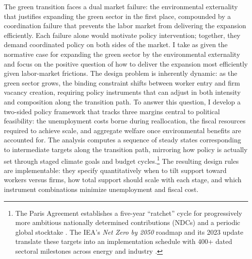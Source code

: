 \documentclass[preprint,12pt]{elsarticle}
\begin{document}
The green transition faces a dual market failure: the environmental externality that justifies expanding the green sector in the first place, compounded by a coordination failure that prevents the labor market from delivering the expansion efficiently. Each failure alone would motivate policy intervention; together, they demand coordinated policy on both sides of the market. I take as given the normative case for expanding the green sector by the environmental externality and focus on the positive question of how to deliver the expansion most efficiently given labor-market frictions. The design problem is inherently dynamic: as the green sector grows, the binding constraint shifts between worker entry and firm vacancy creation, requiring policy instruments that can adjust in both intensity and composition along the transition path. To answer this question, I develop a two-sided policy framework that tracks three margins central to political feasibility: the unemployment costs borne during reallocation, the fiscal resources required to achieve scale, and aggregate welfare once environmental benefits are accounted for. The analysis computes a sequence of steady states corresponding to intermediate targets along the transition path, mirroring how policy is actually set through staged climate goals and budget cycles.\footnote{The Paris Agreement establishes a five-year “ratchet” cycle for progressively more ambitious nationally determined contributions (NDCs) and a periodic global stocktake \citep{unfccc2015paris,unfccc_ndc_cycle}. The IEA’s \textit{Net Zero by 2050} roadmap and its 2023 update translate these targets into an implementation schedule with 400+ dated sectoral milestones across energy and industry \citep{iea2021nze,iea2023nze_update}.} The resulting design rules are implementable: they specify quantitatively when to tilt support toward workers versus firms, how total support should scale with each stage, and which instrument combinations minimize unemployment and fiscal cost.
\end{document}
